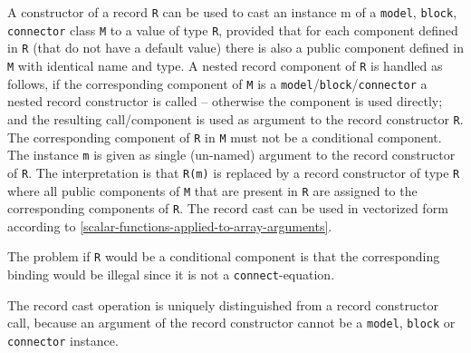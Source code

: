 A constructor of a record \lstinline!R! can be used to cast an instance m of a \lstinline!model!, \lstinline!block!, \lstinline!connector! class \lstinline!M! to a value of type \lstinline!R!, provided that for each component defined in \lstinline!R! (that do not have a default value) there is also a public component defined in \lstinline!M! with identical name and type.
A nested record component of \lstinline!R! is handled as follows, if the corresponding component of \lstinline!M! is a \lstinline!model!/\lstinline!block!/\lstinline!connector! a nested record constructor is called -- otherwise the component is used directly; and the resulting call/component is used as argument to the record constructor \lstinline!R!.
The corresponding component of \lstinline!R! in \lstinline!M! must not be a conditional component.
The instance \lstinline!m! is given as single (un-named) argument to the record constructor of \lstinline!R!.
The interpretation is that \lstinline!R(m)! is replaced by a record constructor of type \lstinline!R! where all public components of \lstinline!M! that are present in \lstinline!R! are assigned to the corresponding components of \lstinline!R!.
The record cast can be used in vectorized form according to \cref{scalar-functions-applied-to-array-arguments}.

\begin{nonnormative}
The problem if \lstinline!R! would be a conditional component is that the corresponding binding would be illegal since it is not a \lstinline!connect!-equation.
\end{nonnormative}

\begin{nonnormative}
The record cast operation is uniquely distinguished from a record constructor call, because an argument of the record constructor cannot be a \lstinline!model!, \lstinline!block! or \lstinline!connector! instance.
\end{nonnormative}

